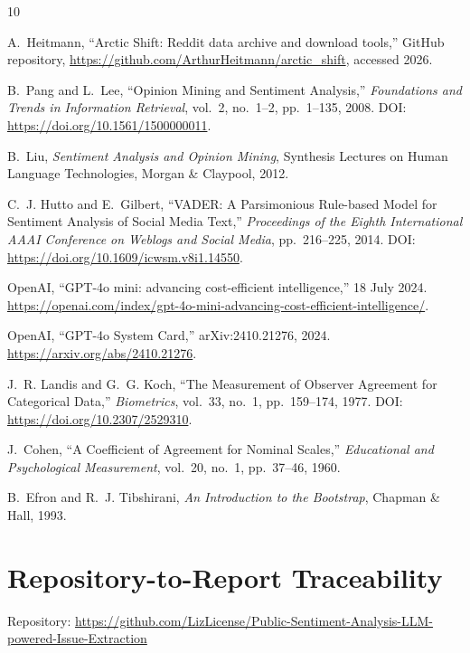 \documentclass[11pt,a4paper]{article}
\begin{document}
\begin{thebibliography}{10}

A.~Heitmann,
``Arctic Shift: Reddit data archive and download tools,''
GitHub repository, \url{https://github.com/ArthurHeitmann/arctic_shift}, accessed 2026.

B.~Pang and L.~Lee,
``Opinion Mining and Sentiment Analysis,''
\textit{Foundations and Trends in Information Retrieval}, vol.~2, no.~1--2, pp.~1--135, 2008. DOI: \url{https://doi.org/10.1561/1500000011}.

B.~Liu,
\textit{Sentiment Analysis and Opinion Mining},
Synthesis Lectures on Human Language Technologies, Morgan \& Claypool, 2012.

C.~J. Hutto and E.~Gilbert,
``VADER: A Parsimonious Rule-based Model for Sentiment Analysis of Social Media Text,''
\textit{Proceedings of the Eighth International AAAI Conference on Weblogs and Social Media},
pp.~216--225, 2014. DOI: \url{https://doi.org/10.1609/icwsm.v8i1.14550}.

OpenAI,
``GPT-4o mini: advancing cost-efficient intelligence,''
18 July 2024. \url{https://openai.com/index/gpt-4o-mini-advancing-cost-efficient-intelligence/}.

OpenAI,
``GPT-4o System Card,''
arXiv:2410.21276, 2024. \url{https://arxiv.org/abs/2410.21276}.

J.~R. Landis and G.~G. Koch,
``The Measurement of Observer Agreement for Categorical Data,''
\textit{Biometrics}, vol.~33, no.~1, pp.~159--174, 1977. DOI: \url{https://doi.org/10.2307/2529310}.

J.~Cohen,
``A Coefficient of Agreement for Nominal Scales,''
\textit{Educational and Psychological Measurement}, vol.~20, no.~1, pp.~37--46, 1960.

B.~Efron and R.~J. Tibshirani,
\textit{An Introduction to the Bootstrap},
Chapman \& Hall, 1993.

\end{thebibliography}

\appendix
\section{Repository-to-Report Traceability}

Repository: \url{https://github.com/LizLicense/Public-Sentiment-Analysis-LLM-powered-Issue-Extraction}
\end{document}
